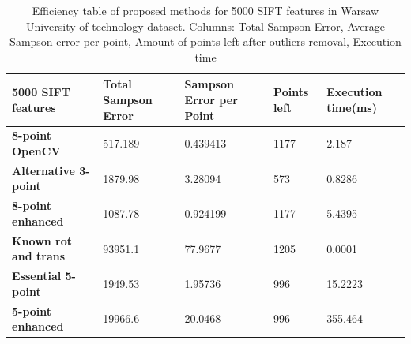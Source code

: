 \begin{table}[p]
\centering
\begin{adjustbox}{width=1\linewidth}
\begin{tabular}{l|l|l|l|l}
\textbf{5000 SIFT features}      & \textbf{Total Sampson Error} & \textbf{Sampson Error per Point} & \textbf{Points left} & \textbf{Execution time(ms)} \\ \hline
\textbf{8-point OpenCV}          & 517.189             & 0.439413                & 1177        & 2.187              \\ \hline
\textbf{Alternative 3-point}     & 1879.98             & 3.28094                 & 573         & 0.8286             \\ \hline
\textbf{8-point enhanced}        & 1087.78             & 0.924199                & 1177        & 5.4395             \\ \hline
\textbf{Known rot and trans}     & 93951.1             & 77.9677                 & 1205        & 0.0001             \\ \hline
\textbf{Essential 5-point}       & 1949.53             & 1.95736                 & 996         & 15.2223            \\ \hline
\textbf{5-point enhanced}        & 19966.6             & 20.0468                 & 996         & 355.464            \\ 
\end{tabular}
\end{adjustbox}
\caption[Efficiency table of proposed methods for 5000 SIFT features in Warsaw University of technology dataset.]{Efficiency table of proposed methods for 5000 SIFT features in Warsaw University of technology dataset. Columns: Total Sampson Error, Average Sampson error per point, Amount of points left after outliers removal, Execution time}
\label{table:Efficiency5000Sift}
\end{table}

